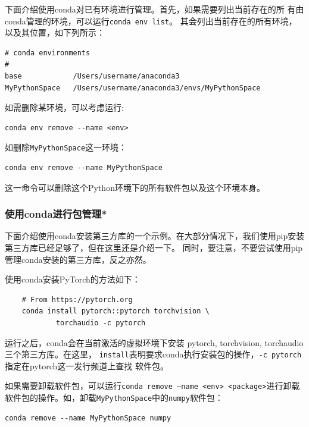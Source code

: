 下面介绍使用conda对已有环境进行管理。首先，如果需要列出当前存在的所
有由conda管理的环境，可以运行\texttt{conda env list}。
其会列出当前存在的所有环境，以及其位置，如下列所示：
\begin{lstlisting}
# conda environments
#
base            /Users/username/anaconda3
MyPythonSpace   /Users/username/anaconda3/envs/MyPythonSpace
\end{lstlisting}
如需删除某环境，可以考虑运行:
\begin{lstlisting}
conda env remove --name <env>
\end{lstlisting}
如删除\texttt{MyPythonSpace}这一环境：
\begin{lstlisting}
conda env remove --name MyPythonSpace
\end{lstlisting}
这一命令可以删除这个Python环境下的所有软件包以及这个环境本身。

\subsubsection{使用conda进行包管理*}
下面介绍使用conda安装第三方库的一个示例。在大部分情况下，我们使用pip安装第三方库已经足够了，但在这里还是介绍一下。
同时，要注意，不要尝试使用pip管理conda安装的第三方库，反之亦然。

使用conda安装PyTorch的方法如下：
\begin{lstlisting}
    # From https://pytorch.org
    conda install pytorch::pytorch torchvision \
            torchaudio -c pytorch
\end{lstlisting}
运行之后，conda会在当前激活的虚拟环境下安装 pytorch, torchvision, torchaudio 三个第三方库。在这里，
\texttt{install}表明要求conda执行安装包的操作，\texttt{-c pytorch}指定在pytorch这一发行频道上查找
软件包。

如果需要卸载软件包，可以运行\texttt{conda remove --name <env> <package>}进行卸载软件包的操作。如，卸载\texttt{MyPythonSpace}中的\texttt{numpy}软件包：
\begin{lstlisting}
conda remove --name MyPythonSpace numpy
\end{lstlisting}